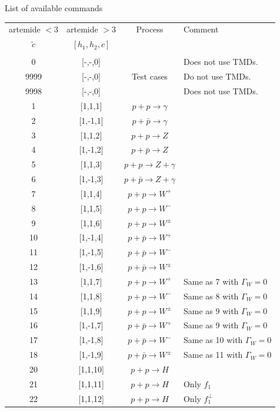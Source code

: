 \documentclass[prd,nofootinbib,eqsecnum,final]{revtex4}
\renewcommand{\(}{\left(}
\renewcommand{\)}{\right)}
\renewcommand{\[}{\left[}
\renewcommand{\]}{\right]}
\begin{document}
\begin{center}
List of available commands
\\
\begin{longtable}{||c|c||c|p{8cm}||}
\hline\hline
artemide $<3$ & artemide $>3$ & Process & Comment
\\ $\tilde c$ & $[h_1,h_2,c]$ & & \\
\\\hline
0 & [-,-,0] &  & Does not use TMDs.
\\
9999 & [-,-,0] & Test cases & Do not use TMDs.
\\
9998 & [-,-,0] &  & Does not use TMDs.
\\\hline
1 & [1,1,1] & $p+p\to \gamma$ &
\\\hline
2 & [1,-1,1] & $p+\bar p\to \gamma$ &
\\\hline
3 & [1,1,2] & $p+p\to Z$ &
\\\hline
4 & [1,-1,2] & $p+\bar p\to Z$ &
\\\hline
5 & [1,1,3] & $p+p\to Z+\gamma$ &
\\\hline
6 & [1,-1,3] & $p+\bar p\to Z+\gamma$ &
\\\hline
7 & [1,1,4] & $p+p\to W^+$ &
\\\hline
8 & [1,1,5] & $p+p\to W^-$ &
\\\hline
9 & [1,1,6] & $p+p\to W^\pm$ &
\\\hline
10 & [1,-1,4] & $p+\bar p\to W^+$ &
\\\hline
11 & [1,-1,5] & $p+\bar p\to W^-$ &
\\\hline
12 & [1,-1,6] & $p+\bar p\to W^\pm$ &
\\\hline
13 & [1,1,7] & $p+p\to W^+$ & Same as 7 with $\Gamma_W=0$
\\\hline
14 & [1,1,8] & $p+p\to W^-$ & Same as 8 with $\Gamma_W=0$
\\\hline
15 & [1,1,9] & $p+p\to W^\pm$ & Same as 9 with $\Gamma_W=0$
\\\hline
16 & [1,-1,7] & $p+\bar p\to W^+$ & Same as 9 with $\Gamma_W=0$
\\\hline
17 & [1,-1,8] & $p+\bar p\to W^-$ & Same as 10 with $\Gamma_W=0$
\\\hline
18 & [1,-1,9] & $p+\bar p\to W^\pm$ & Same as 11 with $\Gamma_W=0$
\\\hline
20 & [1,1,10] & $p+p\to H$ &
\\\hline
21 & [1,1,11] & $p+p\to H$ & Only $f_1$
\\\hline
22 & [1,1,12] & $p+p\to H$ & Only $f_1^\perp$
\\\hline

\end{longtable}
\end{center}
\end{document}
